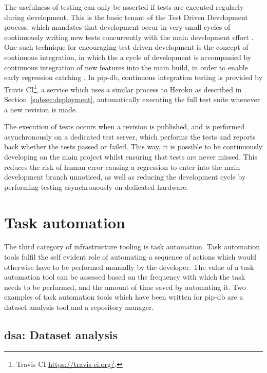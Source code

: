 The usefulness of testing can only be asserted if tests are executed
regularly during development. This is the basic tenant of the Test
Driven Development process, which mandates that development occur in
very small cycles of continuously writing new tests concurrently with
the main development effort \cite{beck2003test}. One such technique
for encouraging test driven development is the concept of continuous
integration, in which the a cycle of development is accompanied by
continuous integration of new features into the main build, in order
to enable early regression catching \cite{fowler2006continuous,
  duvall2007continuous}. In pip-db, continuous integration testing is
provided by Travis CI\footnote{Travis CI
  \url{https://travis-ci.org/}.}, a service which uses a similar
process to Heroku as described in Section~\ref{subsec:deployment},
automatically executing the full test suite whenever a new revision is
made.

The execution of tests occurs when a revision is published, and is
performed asynchronously on a dedicated test server, which performs
the tests and reports back whether the tests passed or failed. This
way, it is possible to be continuously developing on the main project
whilst ensuring that tests are never missed. This reduces the risk of
human error causing a regression to enter into the main development
branch unnoticed, as well as reducing the development cycle by
performing testing asynchronously on dedicated hardware.

\section{Task automation}\label{sec:task-automation}

The third category of infrastructure tooling is task automation. Task
automation tools fulfil the self evident role of automating a sequence
of actions which would otherwise have to be performed manually by the
developer. The value of a task automation tool can be assessed based
on the frequency with which the task needs to be performed, and the
amount of time saved by automating it. Two examples of task automation
tools which have been written for pip-db are a dataset analysis tool
and a repository manager.

\subsection{dsa: Dataset analysis}\label{subsec:dsa}

